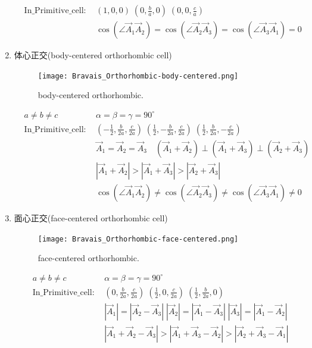\documentclass{article}      %
\begin{document}
\begin{enumerate}
\begin{displaymath}
\begin{aligned}
	&\mathrm{In\_Primitive\_cell}:~&(1,0,0)\;(0,\frac{b}{a},0)\;(0,0,\frac{c}{a})\\
		& &\cos(\angle\vec A_1\vec A_2)=\cos(\angle\vec A_2\vec A_3)=\cos(\angle\vec A_3\vec A_1)=0
	\end{aligned}
\end{displaymath}
		\item 体心正交(\textrm{body-centered orthorhombic cell})
\begin{figure}[h!]
\centering
\texttt{[image: Bravais\_Orthorhombic-body-centered.png]}
\caption{\small body-centered orthorhombic.}%
\label{Bravais:orthorhombic-body-centered}
\end{figure}
\begin{displaymath}
	\begin{aligned}
	&a\neq b\neq c &\alpha=\beta=\gamma=90^{\circ} \\
	&\mathrm{In\_Primitive\_cell}:~&(-\frac12,\frac{b}{2a},\frac{c}{2a})\;(\frac12,-\frac{b}{2a},\frac{c}{2a})\;(\frac12,\frac{b}{2a},-\frac{c}{2a})\\
	& &\vec A_1=\vec A_2=\vec A_3\quad (\vec A_1+\vec A_2)\perp(\vec A_1+\vec A_3)\perp(\vec A_2+\vec A_3)\\ 
	& &|\vec A_1+\vec A_2|>|\vec A_1+\vec A_3|>|\vec A_2+\vec A_3|\\
		& &\cos(\angle\vec A_1\vec A_2)\neq\cos(\angle\vec A_2\vec A_3)\neq\cos(\angle\vec A_3\vec A_1)\neq0
	\end{aligned}
\end{displaymath}
		\item 面心正交(\textrm{face-centered orthorhombic cell})
\begin{figure}[h!]
\centering
\texttt{[image: Bravais\_Orthorhombic-face-centered.png]}
\caption{\small face-centered orthorhombic.}%
\label{Bravais:orthorhombic-face-centered}
\end{figure}
\begin{displaymath}
	\begin{aligned}
	&a\neq b\neq c &\alpha=\beta=\gamma=90^{\circ} \\
	&\mathrm{In\_Primitive\_cell}:~&(0,\frac{b}{2a},\frac{c}{2a})\;(\frac12,0,\frac{c}{2a})\;(\frac12,\frac{b}{2a},0)\\
	& & |\vec A_1|=|\vec A_2-\vec A_3|\;|\vec A_2|=|\vec A_1-\vec A_3|\;|\vec A_3|=|\vec A_1-\vec A_2|\\
	& &|\vec A_1+\vec A_2-\vec A_3|>|\vec A_1+\vec A_3-\vec A_2|>|\vec A_2+\vec A_3-\vec A_1|\\

\end{aligned}
\end{displaymath}
\end{enumerate}
\end{document}
